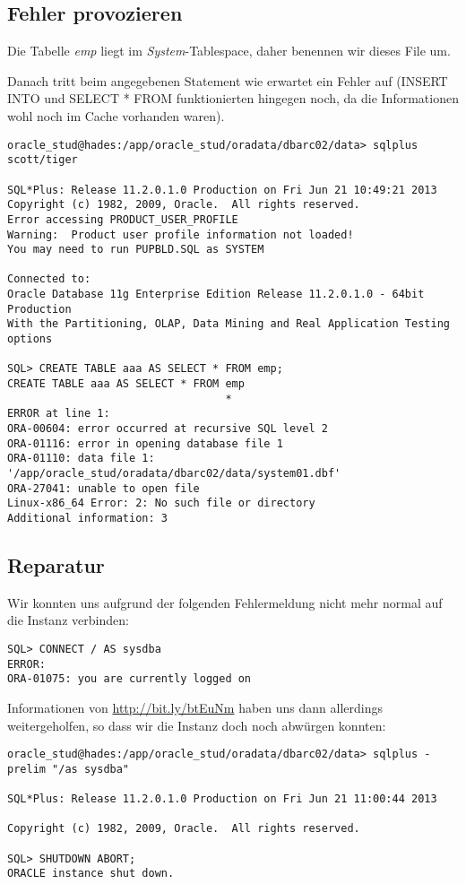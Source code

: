 \documentclass[11pt,a4paper,parskip=half]{scrartcl}
\begin{document}
\subsection{Fehler provozieren}
Die Tabelle \emph{emp} liegt im \emph{System}-Tablespace, daher benennen wir dieses File um.

Danach tritt beim angegebenen Statement wie erwartet ein Fehler auf (INSERT INTO und SELECT * FROM funktionierten hingegen noch, da die Informationen wohl noch im Cache vorhanden waren).
\begin{lstlisting}
oracle_stud@hades:/app/oracle_stud/oradata/dbarc02/data> sqlplus scott/tiger

SQL*Plus: Release 11.2.0.1.0 Production on Fri Jun 21 10:49:21 2013
Copyright (c) 1982, 2009, Oracle.  All rights reserved.
Error accessing PRODUCT_USER_PROFILE
Warning:  Product user profile information not loaded!
You may need to run PUPBLD.SQL as SYSTEM

Connected to:
Oracle Database 11g Enterprise Edition Release 11.2.0.1.0 - 64bit Production
With the Partitioning, OLAP, Data Mining and Real Application Testing options

SQL> CREATE TABLE aaa AS SELECT * FROM emp;
CREATE TABLE aaa AS SELECT * FROM emp
                                  *
ERROR at line 1:
ORA-00604: error occurred at recursive SQL level 2
ORA-01116: error in opening database file 1
ORA-01110: data file 1: '/app/oracle_stud/oradata/dbarc02/data/system01.dbf'
ORA-27041: unable to open file
Linux-x86_64 Error: 2: No such file or directory
Additional information: 3
\end{lstlisting}

\subsection{Reparatur}
Wir konnten uns aufgrund der folgenden Fehlermeldung nicht mehr normal auf die Instanz verbinden:
\begin{lstlisting}
SQL> CONNECT / AS sysdba
ERROR:
ORA-01075: you are currently logged on
\end{lstlisting}

Informationen von \url{http://bit.ly/btEuNm} haben uns dann allerdings weitergeholfen, so dass wir die Instanz doch noch abwürgen konnten:
\begin{lstlisting}
oracle_stud@hades:/app/oracle_stud/oradata/dbarc02/data> sqlplus -prelim "/as sysdba"

SQL*Plus: Release 11.2.0.1.0 Production on Fri Jun 21 11:00:44 2013

Copyright (c) 1982, 2009, Oracle.  All rights reserved.

SQL> SHUTDOWN ABORT;
ORACLE instance shut down.
\end{lstlisting}
\end{document}

